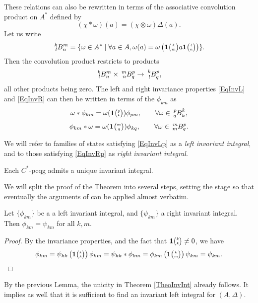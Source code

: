These relations can also  be rewritten in terms of the associative
convolution product on $A^*$  defined by \[(\chi*\omega)(a) =
(\chi\otimes \omega)\Delta(a).\] Let us write \begin{equation}\label{DefSpB} \Gr{B}{k}{m}{l}{n} = \{\omega \in A^* \mid \forall a\in A, \omega(a) = \omega\left(\UnitC{k}{m}a\UnitC{l}{n}\right)\}.\end{equation}Then the convolution product restricts to products \[\Gr{B}{k}{m}{l}{n}\times \Gr{B}{m}{p}{n}{q}\rightarrow \Gr{B}{k}{p}{l}{q},\] all other products being zero. The left and right invariance properties \eqref{EqInvL} and \eqref{EqInvR} can then be written in terms of the $\phi_{km}$ as \begin{equation}\label{EqInvLp}\omega*\phi_{km} = \omega(\UnitC{p}{k})\phi_{pm},\qquad \forall \omega \in \Gr{B}{p}{k}{q}{k},\end{equation}
\begin{equation}\label{EqInvRp}\phi_{km}*\omega = \omega(\UnitC{m}{q})\phi_{kq},\qquad \forall \omega \in \Gr{B}{m}{p}{m}{q}.\end{equation}


We will refer to families of states satisfying \eqref{EqInvLp} as a \emph{left invariant integral}, and to those satisfying \eqref{EqInvRp} as \emph{right invariant integral}.

\begin{Theorem}\label{TheoInvInt} Each $C^*$-pcqg admits a unique invariant integral.
\end{Theorem} 

We will split the proof of the Theorem into several steps, setting the stage so that eventually the arguments of \cite{MVD1} can be applied almost verbatim. 

\begin{Lem} Let $\{\phi_{km}\}$ be a a left invariant integral, and $\{\psi_{km}\}$ a right invariant integral. Then $\phi_{km}= \psi_{km}$ for all $k,m$. 
\end{Lem} 
\begin{proof} By the invariance properties, and the fact that $\mathbf{1}{\tiny {\begin{pmatrix} k\\k\end{pmatrix}}}\neq 0$, we have \[\phi_{km}  = \psi_{kk}\left(\mathbf{1}{\tiny {\begin{pmatrix} k\\k\end{pmatrix}}}\right)\phi_{km} = \psi_{kk}*\phi_{km}= \phi_{km}\left(\mathbf{1}{\tiny {\begin{pmatrix} k\\m\end{pmatrix}}}\right)\psi_{km} = \psi_{km}.\]

\end{proof} 

By the previous Lemma, the unicity in Theorem \ref{TheoInvInt} already follows. It implies as well that it is sufficient to find an invariant left integral for $(A,\Delta)$.


